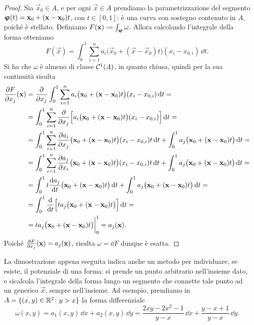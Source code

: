 \begin{proof}
	Sia $\vec x_0\in A$, e per ogni $\vec x\in A$ prendiamo la parametrizzazione del segmento $\bm{\upvarphi}(t)=\mathbf{x}_0+(\mathbf{x}-\mathbf{x}_0)t$, con $t\in[0,1]$: è una curva con sostegno contenuto in $A$, poich\'e è stellato.
	Definiamo $F(\vec x)\defeq\int_{\vphi}\omega$. Allora calcolando l'integrale della forma otteniamo
	\begin{equation}
		F(\vec x)=\int_0^1\sum_{i=1}^na_i\big(\vec x_0+(\vec x-\vec x_0)t\big)(x_i-x_{0,i})\,\dd t.
	\end{equation}
	Si ha  che $\omega$ è almeno di classe $\mathcal{C}^{{1}}(A)$, in quanto chiusa, quindi per la sua continuità risulta
	\begin{equation}
		\begin{split}
			\frac{\partial {F}}{\partial {x_j}}(\mathbf{x})&=\frac{\partial {}}{\partial {x_j}}\int_0^1\sum_{i=1}^na_i\big(\mathbf{x}_0+(\mathbf{x}-\mathbf{x}_0)t\big)(x_i-x_{0,i})\,\textup{d} t=\\
			&=\int_0^1\sum_{i=1}^n\frac{\partial {}}{\partial {x_j}}\Big[a_i\big(\mathbf{x}_0+(\mathbf{x}-\mathbf{x}_0)t\big)(x_i-x_{0,i})\Big]\,\textup{d} t=\\
			&=\int_0^1\sum_{i=1}^n\frac{\partial {a_i}}{\partial {x_j}}\big(\mathbf{x}_0+(\mathbf{x}-\mathbf{x}_0)t\big)(x_i-x_{0,i})t\,\textup{d} t+\int_0^1a_j\big(\mathbf{x}_0+(\mathbf{x}-\mathbf{x}_0)t\big)\,\textup{d} t=\\
			&=\int_0^1\sum_{i=1}^n\frac{\partial {a_j}}{\partial {x_i}}\big(\mathbf{x}_0+(\mathbf{x}-\mathbf{x}_0)t\big)(x_i-x_{0,i})t\,\textup{d} t+\int_0^1a_j\big(\mathbf{x}_0+(\mathbf{x}-\mathbf{x}_0)t\big)\,\textup{d} t=\\
			&=\int_0^1t\frac{\textup{d} {a_j}}{\textup{d} {t}}\big(\mathbf{x}_0+(\mathbf{x}-\mathbf{x}_0)t\big)\,\textup{d} t+\int_0^1a_j\big(\mathbf{x}_0+(\mathbf{x}-\mathbf{x}_0)t\big)\,\textup{d} t=\\
			&=\int_0^1\frac{\textup{d} {}}{\textup{d} {t}}\Big[ta_j\big(\mathbf{x}_0+(\mathbf{x}-\mathbf{x}_0)t\big)\Big]\,\textup{d} t=\\
			&=ta_j\big(\mathbf{x}_0+(\mathbf{x}-\mathbf{x}_0)t\big)\bigg|_0^1=a_j(\mathbf{x}).
		\end{split}
	\end{equation}
	Poich\'e $\frac{\partial {F}}{\partial {x_j}}(\mathbf{x})=a_j(\mathbf{x})$, risulta $\omega=\dd F$ dunque è esatta.
\end{proof}
La dimostrazione appena eseguita indica anche un metodo per individuare, se esiste, il potenziale di una forma: si prende un punto arbitrario nell'insieme dato, e sicalcola l'integrale della forma lungo un segmento che connette tale punto ad un generico $\vec x$, sempre nell'insieme.
Ad esempio, prendiamo in $A=\{(x,y)\in\mathbb{R}^2\colon y>x\}$ la forma differenziale
\begin{equation*}
	\omega(x,y)=a_1(x,y)\,\dd x+a_2(x,y)\,\dd y=\frac{2xy-2x^2-1}{y-x}\,\dd x+\frac{y-x+1}{y-x}\,\dd y.
\end{equation*}
